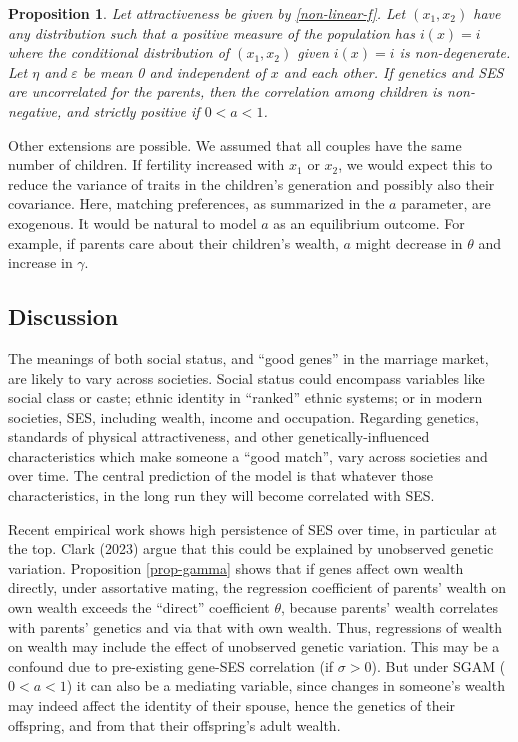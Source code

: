 \documentclass[
  12pt,
]{article}
\newtheorem{proposition}{Proposition}
\theoremstyle{definition}
\theoremstyle{definition}
\theoremstyle{definition}
\theoremstyle{definition}
\theoremstyle{remark}
\begin{document}
\begin{proposition}\label{prop-non-normal}
Let attractiveness be given by \eqref{non-linear-f}. Let $(x_1, x_2)$ have
any distribution such that a positive measure of the population has
$i(x) = i$ where the conditional distribution of $(x_1, x_2)$ given $i(x) = i$ is 
non-degenerate. Let $\eta$ and $\varepsilon$ be mean 0 and independent of
$x$ and each other. If genetics and SES are uncorrelated for the parents, then
the correlation among children is non-negative, and strictly positive if 
$0 < a < 1$.
\end{proposition}

Other extensions are possible. We assumed that all couples have the same number
of children. If fertility increased with \(x_1\) or \(x_2\), we would expect this to
reduce the variance of traits in the children's generation and possibly also
their covariance. Here, matching preferences, as summarized in the \(a\) parameter,
are exogenous. It would be natural to model \(a\) as an equilibrium outcome.
For example, if parents care about their children's wealth, \(a\) might decrease
in \(\theta\) and increase in \(\gamma\).

\hypertarget{discussion}{%
\subsection{Discussion}\label{discussion}}

The meanings of both social status, and ``good genes'' in the
marriage market, are likely to vary across societies. Social status could
encompass variables like social class or caste; ethnic identity in
``ranked'' ethnic systems; or in modern societies, SES, including wealth, income
and occupation. Regarding genetics, standards of physical attractiveness, and
other genetically-influenced characteristics which make someone a ``good match'',
vary across societies and over time. The central prediction of the model is that
whatever those characteristics, in the long run they will become correlated with
SES.

Recent empirical work shows high persistence of SES over time, in particular at
the top. Clark (2023) argue that this could be explained by unobserved
genetic variation.
Proposition \ref{prop-gamma} shows that if genes affect own wealth directly,
under assortative mating, the regression coefficient of parents' wealth on own
wealth exceeds the ``direct'' coefficient \(\theta\), because parents' wealth
correlates with parents' genetics and via that with own wealth. Thus,
regressions of wealth on wealth may include the effect of unobserved genetic
variation. This may be a confound due to pre-existing gene-SES correlation (if
\(\sigma > 0\)). But under SGAM (\(0 < a < 1\)) it can also be a mediating
variable, since changes in someone's wealth may indeed affect the identity of
their spouse, hence the genetics of their offspring, and from that their
offspring's adult wealth.
\end{document}
